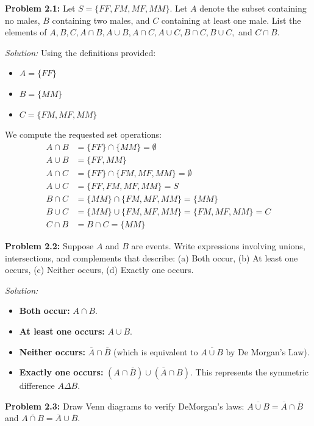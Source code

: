 \documentclass[11pt]{article}
\newcommand{\prob}[1]{\vspace{4mm}\noindent\textbf{Problem #1:}}
\newcommand{\sol}{\vspace{2mm}\noindent\textit{Solution: }}
\begin{document}
\prob{2.1}
Let $S = \{FF, FM, MF, MM\}$. Let $A$ denote the subset containing no males, $B$ containing two males, and $C$ containing at least one male. List the elements of $A, B, C, A \cap B, A \cup B, A \cap C, A \cup C, B \cap C, B \cup C,$ and $C \cap B$.

\sol 
Using the definitions provided:
\begin{itemize}
    \item $A = \{FF\}$
    \item $B = \{MM\}$
    \item $C = \{FM, MF, MM\}$
\end{itemize}
We compute the requested set operations:
\begin{align*}
    A \cap B &= \{FF\} \cap \{MM\} = \emptyset \\
    A \cup B &= \{FF, MM\} \\
    A \cap C &= \{FF\} \cap \{FM, MF, MM\} = \emptyset \\
    A \cup C &= \{FF, FM, MF, MM\} = S \\
    B \cap C &= \{MM\} \cap \{FM, MF, MM\} = \{MM\} \\
    B \cup C &= \{MM\} \cup \{FM, MF, MM\} = \{FM, MF, MM\} = C \\
    C \cap B &= B \cap C = \{MM\}
\end{align*}

\prob{2.2}
Suppose $A$ and $B$ are events. Write expressions involving unions, intersections, and complements that describe: (a) Both occur, (b) At least one occurs, (c) Neither occurs, (d) Exactly one occurs.

\sol 
\begin{itemize}
    \item[\textbf{a)}] \textbf{Both occur:} $A \cap B$.
    \item[\textbf{b)}] \textbf{At least one occurs:} $A \cup B$.
    \item[\textbf{c)}] \textbf{Neither occurs:} $\overline{A} \cap \overline{B}$ (which is equivalent to $\overline{A \cup B}$ by De Morgan's Law).
    \item[\textbf{d)}] \textbf{Exactly one occurs:} $(A \cap \overline{B}) \cup (\overline{A} \cap B)$. This represents the symmetric difference $A \Delta B$.
\end{itemize}

\prob{2.3}
Draw Venn diagrams to verify DeMorgan's laws: $\overline{A \cup B} = \overline{A} \cap \overline{B}$ and $\overline{A \cap B} = \overline{A} \cup \overline{B}$.
\end{document}
